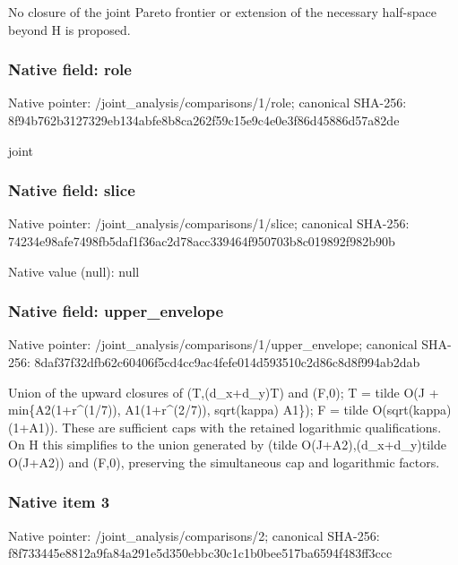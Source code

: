\documentclass[10pt,a4paper]{article}
\begin{document}
\begingroup\raggedright\sloppy No closure of the joint Pareto frontier or extension of the necessary half-space beyond H is proposed.\par\endgroup

\subsubsection{Native field: role}
Native pointer: /joint\_\allowbreak{}analysis/comparisons/1/role; canonical SHA-256: 8f94b762b3127329eb134abfe8b8ca262f59c15e9c4e0e3f86d45886d57a82de

\begingroup\raggedright\sloppy joint\par\endgroup

\subsubsection{Native field: slice}
Native pointer: /joint\_\allowbreak{}analysis/comparisons/1/slice; canonical SHA-256: 74234e98afe7498fb5daf1f36ac2d78acc339464f950703b8c019892f982b90b

Native value (null): null

\subsubsection{Native field: upper\_\allowbreak{}envelope}
Native pointer: /joint\_\allowbreak{}analysis/comparisons/1/upper\_\allowbreak{}envelope; canonical SHA-256: 8daf37f32dfb62c60406f5cd4cc9ac4fefe014d593510c2d86c8d8f994ab2dab

\begingroup\raggedright\sloppy Union of the upward closures of (T,\allowbreak{}(d\_\allowbreak{}x+d\_\allowbreak{}y)T) and (F,\allowbreak{}0);\allowbreak{} T =\allowbreak{} tilde O(J + min\{A2(1+r\textasciicircum{}(1/\allowbreak{}7)),\allowbreak{} A1(1+r\textasciicircum{}(2/\allowbreak{}7)),\allowbreak{} sqrt(kappa) A1\});\allowbreak{} F =\allowbreak{} tilde O(sqrt(kappa)(1+A1)). These are sufficient caps with the retained logarithmic qualifications. On H this simplifies to the union generated by (tilde O(J+A2),\allowbreak{}(d\_\allowbreak{}x+d\_\allowbreak{}y)tilde O(J+A2)) and (F,\allowbreak{}0),\allowbreak{} preserving the simultaneous cap and logarithmic factors.\par\endgroup

\subsubsection{Native item 3}
Native pointer: /joint\_\allowbreak{}analysis/comparisons/2; canonical SHA-256: f8f733445e8812a9fa84a291e5d350ebbc30c1c1b0bee517ba6594f483ff3ccc
\end{document}
